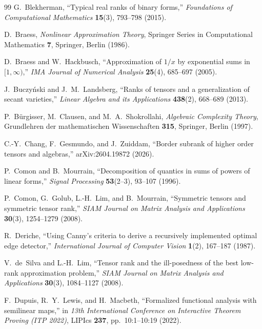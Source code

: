 \documentclass[11pt,a4paper]{article}
\theoremstyle{plain}
\theoremstyle{definition}
\begin{document}
\begin{thebibliography}{99}
G.~Blekherman,
``Typical real ranks of binary forms,''
\emph{Foundations of Computational Mathematics} \textbf{15}(3), 793--798 (2015).

D.~Braess,
\emph{Nonlinear Approximation Theory},
Springer Series in Computational Mathematics \textbf{7}, Springer, Berlin (1986).

D.~Braess and W.~Hackbusch,
``Approximation of $1/x$ by exponential sums in $[1,\infty)$,''
\emph{IMA Journal of Numerical Analysis} \textbf{25}(4), 685--697 (2005).

J.~Buczy\'nski and J.~M.~Landsberg,
``Ranks of tensors and a generalization of secant varieties,''
\emph{Linear Algebra and its Applications} \textbf{438}(2), 668--689 (2013).

P.~B\"urgisser, M.~Clausen, and M.~A.~Shokrollahi,
\emph{Algebraic Complexity Theory},
Grund\-lehren der mathe\-matischen Wissen\-schaften \textbf{315}, Springer, Berlin (1997).

C.-Y.~Chang, F.~Gesmundo, and J.~Zuiddam,
``Border subrank of higher order tensors and algebras,''
arXiv:2604.19872 (2026).

P.~Comon and B.~Mourrain,
``Decomposition of quantics in sums of powers of linear forms,''
\emph{Signal Processing} \textbf{53}(2--3), 93--107 (1996).

P.~Comon, G.~Golub, L.-H.~Lim, and B.~Mourrain,
``Symmetric tensors and symmetric tensor rank,''
\emph{SIAM Journal on Matrix Analysis and Applications} \textbf{30}(3), 1254--1279 (2008).

R.~Deriche,
``Using Canny's criteria to derive a recursively implemented optimal edge detector,''
\emph{International Journal of Computer Vision} \textbf{1}(2), 167--187 (1987).

V.~de~Silva and L.-H.~Lim,
``Tensor rank and the ill-posedness of the best low-rank approximation problem,''
\emph{SIAM Journal on Matrix Analysis and Applications} \textbf{30}(3), 1084--1127 (2008).

F.~Dupuis, R.~Y.~Lewis, and H.~Macbeth,
``Formalized functional analysis with semilinear maps,''
in \emph{13th International Conference on Interactive Theorem Proving (ITP 2022)}, LIPIcs \textbf{237}, pp.~10:1--10:19 (2022).


\end{thebibliography}
\end{document}
